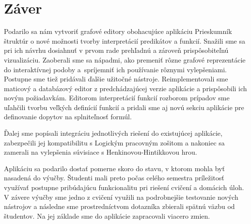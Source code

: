 \chapter*{Záver}  %

Podarilo sa nám vytvoriť grafové editory obohacujúce aplikáciu Prieskumník štruktúr o nové možnosti tvorby interpretácií predikátov a funkcií. Snažili sme sa pri ich návrhu dosiahnuť v prvom rade prehľadnú a zároveň prispôsobiteľnú vizualizáciu. Zaoberali sme sa nápadmi, ako premeniť rôzne grafové reprezentácie do interaktívnej podoby a~spríjemniť ich používanie rôznymi vylepšeniami. Postupne sme tiež pridávali ďalšie užitočné nástroje. Reimplementovali sme maticový a databázový editor z predchádzajúcej verzie aplikácie a prispôsobili ich novým požiadavkám. Editorom interpretácií funkcií rozborom prípadov sme uľahčili tvorbu veľkých definícií funkcií a pridali sme aj novú sekciu aplikácie pre definovanie dopytov na splniteľnosť formúl.


Ďalej sme popísali integráciu jednotlivých riešení do existujúcej aplikácie, zabezpečili jej kompatibilitu s Logickým pracovným zošitom a nakoniec sa zamerali na vylepšenia súvisiace s Henkinovou-Hintikkovou hrou.

Aplikáciu sa podarilo dostať pomerne skoro do stavu, v ktorom mohla byť nasadená do výučby. Študenti mali preto počas celého semestra príležitosť využívať postupne pribúdajúcu funkcionalitu pri riešení cvičení a domácich úloh. V závere výučby sme jedno z cvičení využili na podrobnejšie testovanie nových nástrojov a následne sme prostredníctvom dotazníka zbierali spätnú väzbu od študentov. Na jej základe sme do aplikácie zapracovali viacero zmien.

